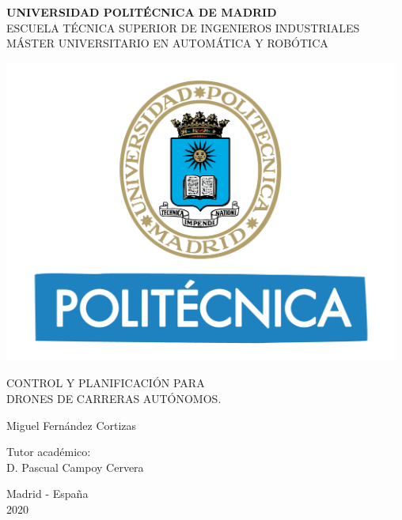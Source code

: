 
\begin{center}
	\textbf{ UNIVERSIDAD POLITÉCNICA DE MADRID }\\
	ESCUELA TÉCNICA SUPERIOR DE INGENIEROS INDUSTRIALES\\
	MÁSTER UNIVERSITARIO EN AUTOMÁTICA Y ROBÓTICA
	
	
	\vspace{1cm}
	
	\includegraphics[height = 10cm]{portada/logoupm}
	
	\vspace{1cm}

	{\LARGE	 CONTROL Y PLANIFICACIÓN PARA }\\
	
		 \vspace{0.2cm}
		 {\LARGE DRONES DE CARRERAS AUTÓNOMOS.}
	
	\vspace{2cm}
	
	{\Large Miguel Fernández Cortizas}\\
	
	
	
	
	\vspace{2cm}
	
	{\large  Tutor académico:}\\
	\vspace{0.2cm}
	{\Large D. Pascual Campoy Cervera }
	
	\vspace{0.5cm}
	
	
	\vfill{\Large Madrid - Espa\~{n}a\\
		2020}

\end{center}
\newpage

